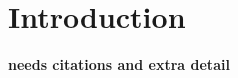\documentclass[11pt]{article}
\begin{document}
\section{Introduction}
\label{sec:intro}
{\bf needs citations and extra detail}
%
\end{document}
